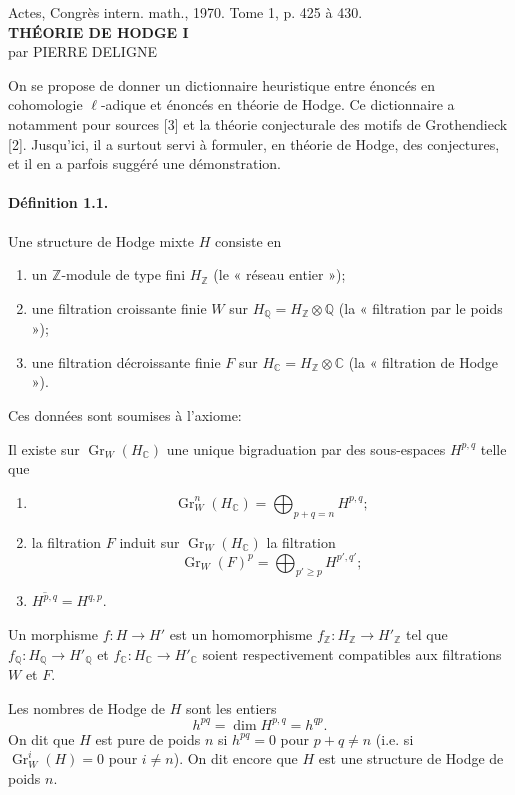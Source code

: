 \documentclass[10pt]{article}
\newcommand{\C}{\mathbb C}
\newcommand{\Q}{\mathbb Q}
\newcommand{\Z}{\mathbb Z}
\newcommand{\Gr}{\operatorname{Gr}}
\begin{document}
\begin{center}
{\small Actes, Congrès intern. math., 1970. Tome 1, p. 425 à 430.}\\[4em]
{\Large\bfseries THÉORIE DE HODGE I}\\[1.6em]
{\large par PIERRE DELIGNE}
\end{center}

On se propose de donner un dictionnaire heuristique entre énoncés en cohomologie $\ell$-adique et énoncés en théorie de Hodge. Ce dictionnaire a notamment pour sources [3] et la théorie conjecturale des motifs de Grothendieck [2]. Jusqu'ici, il a surtout servi à formuler, en théorie de Hodge, des conjectures, et il en a parfois suggéré une démonstration.

\paragraph{Définition 1.1.} Une structure de Hodge mixte $H$ consiste en
\begin{enumerate}[label=(\alph*)]
\item un $\Z$-module de type fini $H_\Z$ (le « réseau entier »);
\item une filtration croissante finie $W$ sur $H_\Q=H_\Z\otimes\Q$ (la « filtration par le poids »);
\item une filtration décroissante finie $F$ sur $H_\C=H_\Z\otimes\C$ (la « filtration de Hodge »).
\end{enumerate}
Ces données sont soumises à l'axiome:

Il existe sur $\Gr_W(H_\C)$ une unique bigraduation par des sous-espaces $H^{p,q}$ telle que
\begin{enumerate}[label=(\roman*)]
\item
\[
\Gr_W^n(H_\C)=\bigoplus_{p+q=n}H^{p,q};
\]
\item la filtration $F$ induit sur $\Gr_W(H_\C)$ la filtration
\[
\Gr_W(F)^p=\bigoplus_{p'\ge p}H^{p',q'};
\]
\item $\overline{H^{p,q}}=H^{q,p}$.
\end{enumerate}
Un morphisme $f:H\to H'$ est un homomorphisme $f_\Z:H_\Z\to H'_\Z$ tel que $f_\Q:H_\Q\to H'_\Q$ et $f_\C:H_\C\to H'_\C$ soient respectivement compatibles aux filtrations $W$ et $F$.

Les nombres de Hodge de $H$ sont les entiers
\[
\tag{1.2}
h^{pq}=\dim H^{p,q}=h^{qp}.
\]
On dit que $H$ est pure de poids $n$ si $h^{pq}=0$ pour $p+q\ne n$ (i.e. si $\Gr_W^i(H)=0$ pour $i\ne n$). On dit encore que $H$ est une structure de Hodge de poids $n$.
\end{document}
